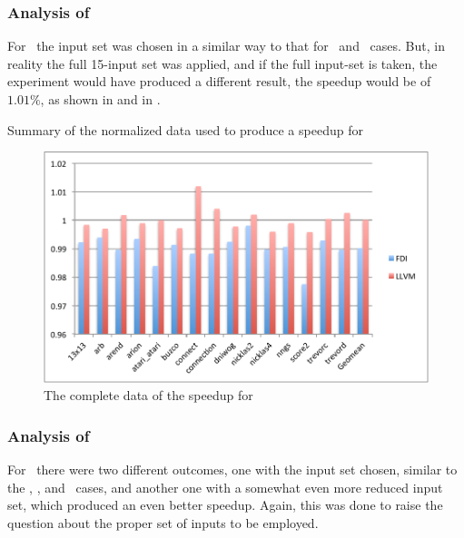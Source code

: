 
\subsubsection{Analysis of \gobmk}

For \gobmk\ the input set was chosen in a similar way to that for \bzip\ and \gzip\ cases. But, in reality the full 15-input set was applied, and if the full input-set is taken, the experiment would have produced a different result, the speedup would be of $1.01 \%$, as shown in  and in .

\begin{table}
  \centering
  \begin{tiny}
  
  \end{tiny}
  \caption{Summary of the normalized data used to produce a speedup for \gcc}
  \label{tab:fullspeedupgbk}
\end{table}

\begin{figure}
  \centering
  \includegraphics[width=1.00\linewidth]{Figures/speedupgbkall}
  \caption{The complete data of the speedup for \gobmk}
  \label{fig:gobmkall}
\end{figure}


\subsubsection{Analysis of \gcc}

For \gcc\ there were two different outcomes, one with the input set chosen, similar to the \bzip, \gzip, and \gobmk\ cases, and another one with a somewhat even more reduced input set, which produced an even better speedup. Again, this was done to raise the question about the proper set of inputs to be employed.


